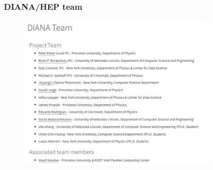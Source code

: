 \begin{frame}
\frametitle{DIANA/HEP team}

\begin{figure}[htbp]
\begin{center}
\includegraphics[width=0.9\textwidth]{images/20170110-diana-team.png}
\end{center}
\end{figure}

\end{frame}


